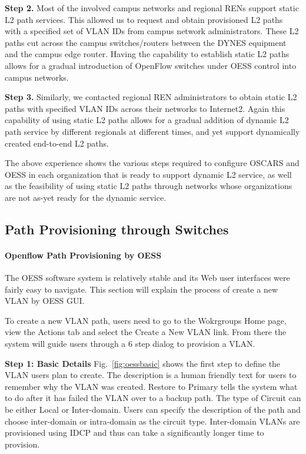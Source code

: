 {\textbf{Step 2.} Most of the involved campus networks and regional
RENs support static L2 path services. This allowed us to request and obtain provisioned L2 paths with a specified set of
VLAN IDs from campus network administrators. These L2
paths cut across the campus switches/routers between the
DYNES equipment and the campus edge router. Having the
capability to establish static L2 paths allows for a gradual
introduction of OpenFlow switches under OESS control into
campus networks.

\textbf{Step 3.} Similarly, we contacted regional REN administrators to obtain static L2 paths with specified VLAN IDs
across their networks to Internet2. Again this capability of using static L2 paths allows for a gradual addition of
dynamic L2 path service by different regionals at different
times, and yet support dynamically created end-to-end L2
paths.

The above experience shows the various steps required to
configure OSCARS and OESS in each organization that is
ready to support dynamic L2 service, as well as the feasibility of using static L2 paths through networks whose organizations are not as-yet ready for the dynamic service.

\subsection{Path Provisioning through Switches}
\paragraph{Openflow Path Provisioning by OESS}
The OESS \cite{OESS} software system is relatively stable and its Web user interfaces were fairly easy to navigate. This section will explain the process of create a new VLAN by OESS GUI.

To create a new VLAN path, users need to go to the Wokrgroups Home page, view the Actions tab and select the Create a New VLAN link. From there the system will guide users through a 6 step dialog to provision a VLAN.

\textbf{Step 1:  Basic Details}
Fig.~\ref{fig:oessbasic} shows the first step to define the VLAN users plan to create. 
The description is a human friendly text for users to remember why the VLAN was created. Restore to Primary tells the system what to do after it has failed the VLAN over to a backup path. The type of Circuit can be either Local or Inter-domain. Users can specify the description of the path and choose inter-domain or intra-domain as the circuit type. Inter-domain VLANs are provisioned using IDCP and thus can take a significantly longer time to provision. 

}
